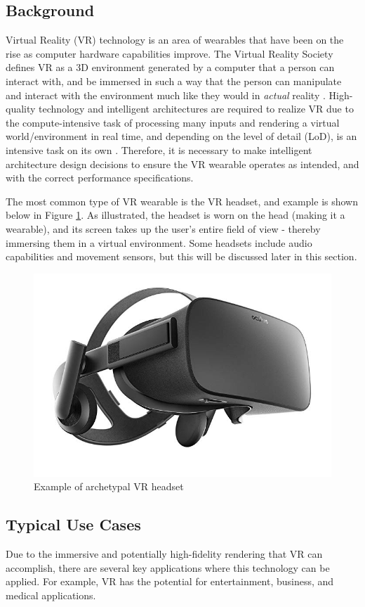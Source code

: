 \subsection{Background}
Virtual Reality (VR) technology is an area of wearables that have been on the rise
as computer hardware capabilities improve. The Virtual Reality Society defines VR as
a 3D environment generated by a computer that a person can interact with, and be
immersed in such a way that the person can manipulate and interact with the environment
much like they would in \textit{actual} reality \cite{vr_soc_defn}. High-quality
technology and intelligent architectures are required to realize VR due to
the compute-intensive task of processing many inputs and rendering a virtual
world/environment in real time, and depending on the level of detail (LoD), is
an intensive task on its own \cite{hickey_wt4_pres}. Therefore, it is necessary
to make intelligent architecture design decisions to ensure the VR wearable operates
as intended, and with the correct performance specifications.

The most common type of VR wearable is the VR headset, and example is shown below in
Figure \ref{vr:example}. As illustrated, the headset is worn on the head (making it
a wearable), and its screen takes up the user's entire field of view - thereby immersing
them in a virtual environment. Some headsets include audio capabilities and movement
sensors, but this will be discussed later in this section.


\begin{figure}[h]
    \centering
    \includegraphics[width=.3\linewidth]{media/vr_headset_example.jpg}
    \caption{Example of archetypal VR headset \cite{vr_headset_pic}}
    \label{vr:example}
\end{figure}

\subsection{Typical Use Cases}
Due to the immersive and potentially high-fidelity rendering that VR can accomplish,
there are several key applications where this technology can be applied. For example, 
VR has the potential for entertainment, business, and medical applications.


